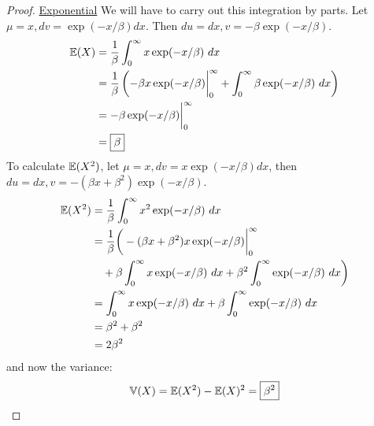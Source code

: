 \documentclass[a4paper]{article}
\begin{document}
\begin{proof}[Proof]
\underline{Exponential}
We will have to carry out this integration by parts. Let \(\mu = x, dv = \exp(-x/\beta ) dx\). Then \(du = dx, v = -\beta \exp(-x/\beta )\).
\begin{align*}
	\E(X) & = \frac{1}{\beta } \int^{\infty}_{0} x \exp(-x/\beta ) \ dx  \\
	 & = \frac{1}{\beta } \left( -\beta x \exp(-x/\beta ) \bigg|^{\infty}_{0} + \int^{\infty}_{0} \beta \exp(-x/\beta ) \ dx  \right)   \\
	 & = -\beta \exp(-x/\beta ) \bigg| ^{\infty}_{0} \\
	 & = \boxed{\beta }
\end{align*}
To calculate \(\mathbb{E}(X^{2})\), let \(\mu = x, dv = x \exp(-x/\beta ) dx\), then \(du = dx, v = -(\beta x + \beta^{2}) \exp(-x/\beta )\).
\begin{align*}
	\mathbb{E}(X^{2}) & = \frac{1}{\beta } \int^{\infty}_{0} x^{2} \exp(-x/\beta ) \ dx  \\
	 & = \frac{1}{\beta } \bigg( -(\beta x + \beta^{2}) x \exp(-x/\beta ) \bigg|^{\infty}_{0} \\
	 & \quad + \beta \int^{\infty}_{0} x \exp(-x/\beta ) \ dx + \beta^{2} \int^{\infty}_{0} \exp(-x/\beta ) \ dx   \bigg)  \\ 
	 & = \int^{\infty}_{0} x \exp(-x/\beta ) \ dx + \beta \int^{\infty}_{0} \exp(-x/\beta ) \ dx \\
	 & = \beta^{2} + \beta^{2} \\
	 & = 2 \beta^{2}
\end{align*}
and now the variance:
\[
	\mathbb{V}(X) = \mathbb{E}(X^{2}) - \mathbb{E}(X)^{2} = \boxed{\beta^{2}}
\]


\end{proof}
\end{document}
